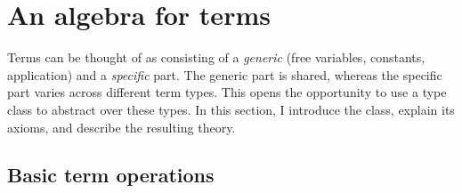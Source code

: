 
\section{An algebra for terms}
\label{sec:terms:algebra}


\noindent
Terms can be thought of as consisting of a \emph{generic} (free variables, constants, application) and a \emph{specific} part.
The generic part is shared, whereas the specific part varies across different term types.
This opens the opportunity to use a type class to abstract over these types.%
In this section, I introduce the  class, explain its axioms, and describe the resulting theory.


\subsection{Basic term operations}

